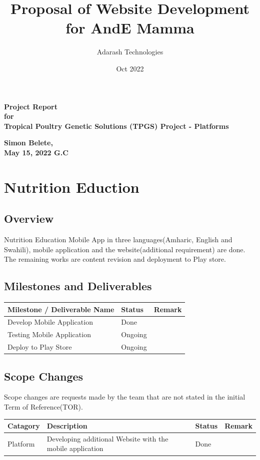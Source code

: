 \documentclass[12pt]{extarticle}
\title{Proposal of Website Development for AndE Mamma}
\author{{Adarash Technologies}}
\date{Oct 2022}
\begin{document}
\begin{titlepage}
    \centering
    \vfill
    {\bfseries\Large
        Project Report\\
        for\\
        Tropical Poultry Genetic Solutions (TPGS) Project - Platforms\\
        \vskip2cm
 
    }    
    \vfill
    \vfill 
    \vfill 
    \vspace{15pt}
    \textbf{
    Simon Belete,
    \\
			May 15, 2022 G.C
		}
    
    \vfill
\end{titlepage}

\newpage

\tableofcontents
\newpage


\section{Nutrition Eduction}
\subsection{Overview}
Nutrition Education Mobile App in three languages(Amharic, English and Swahili), mobile application and the website(additional requirement) are done. The remaining works are content revision and deployment to Play store. 

\subsection{Milestones and Deliverables}
\begin{center}
\begin{tabular}{ |p{7cm}|p{3cm}|p{4cm}| } 
\hline
\textbf{Milestone / Deliverable Name} & \textbf{Status} & \textbf{Remark}  \\
\hline
Develop Mobile Application &  Done &  \\
\hline
Testing Mobile Application &  Ongoing & \\
\hline
Deploy to Play Store &  Ongoing & \\
\hline
\end{tabular}
\end{center}

\subsection{Scope Changes}
Scope changes are requests made by the team that are not stated in the initial Term of Reference(TOR).
\begin{center}
\begin{tabular}{ |p{2cm}|p{7cm}|p{3cm}|p{2cm}| } 
\hline
\textbf{Catagory} & \textbf{Description} & \textbf{Status} & \textbf{Remark}  \\
\hline
Platform & Developing additional Website with the mobile application & Done & \\
\hline

\hline
\end{tabular}
\end{center}
\end{document}
